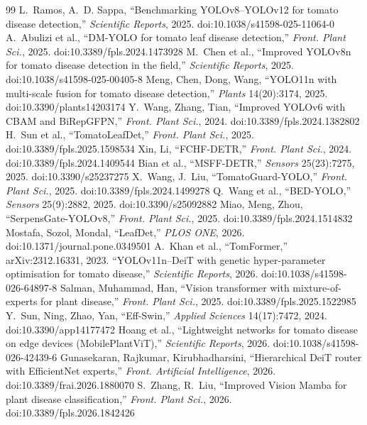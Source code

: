 \begin{thebibliography}{99}
 L.~Ramos, A.~D. Sappa, ``Benchmarking YOLOv8--YOLOv12 for tomato disease detection,'' \emph{Scientific Reports}, 2025. doi:10.1038/s41598-025-11064-0
 A.~Abulizi et al., ``DM-YOLO for tomato leaf disease detection,'' \emph{Front. Plant Sci.}, 2025. doi:10.3389/fpls.2024.1473928
 M.~Chen et al., ``Improved YOLOv8n for tomato disease detection in the field,'' \emph{Scientific Reports}, 2025. doi:10.1038/s41598-025-00405-8
 Meng, Chen, Dong, Wang, ``YOLO11n with multi-scale fusion for tomato disease detection,'' \emph{Plants} 14(20):3174, 2025. doi:10.3390/plants14203174
 Y.~Wang, Zhang, Tian, ``Improved YOLOv6 with CBAM and BiRepGFPN,'' \emph{Front. Plant Sci.}, 2024. doi:10.3389/fpls.2024.1382802
 H.~Sun et al., ``TomatoLeafDet,'' \emph{Front. Plant Sci.}, 2025. doi:10.3389/fpls.2025.1598534
 Xin, Li, ``FCHF-DETR,'' \emph{Front. Plant Sci.}, 2024. doi:10.3389/fpls.2024.1409544
 Bian et al., ``MSFF-DETR,'' \emph{Sensors} 25(23):7275, 2025. doi:10.3390/s25237275
 X.~Wang, J.~Liu, ``TomatoGuard-YOLO,'' \emph{Front. Plant Sci.}, 2025. doi:10.3389/fpls.2024.1499278
 Q.~Wang et al., ``BED-YOLO,'' \emph{Sensors} 25(9):2882, 2025. doi:10.3390/s25092882
 Miao, Meng, Zhou, ``SerpensGate-YOLOv8,'' \emph{Front. Plant Sci.}, 2025. doi:10.3389/fpls.2024.1514832
 Mostafa, Sozol, Mondal, ``LeafDet,'' \emph{PLOS ONE}, 2026. doi:10.1371/journal.pone.0349501
 A.~Khan et al., ``TomFormer,'' arXiv:2312.16331, 2023.
 ``YOLOv11n--DeiT with genetic hyper-parameter optimisation for tomato disease,'' \emph{Scientific Reports}, 2026. doi:10.1038/s41598-026-64897-8
 Salman, Muhammad, Han, ``Vision transformer with mixture-of-experts for plant disease,'' \emph{Front. Plant Sci.}, 2025. doi:10.3389/fpls.2025.1522985
 Y.~Sun, Ning, Zhao, Yan, ``Eff-Swin,'' \emph{Applied Sciences} 14(17):7472, 2024. doi:10.3390/app14177472
 Hoang et al., ``Lightweight networks for tomato disease on edge devices (MobilePlantViT),'' \emph{Scientific Reports}, 2026. doi:10.1038/s41598-026-42439-6
 Gunasekaran, Rajkumar, Kirubhadharsini, ``Hierarchical DeiT router with EfficientNet experts,'' \emph{Front. Artificial Intelligence}, 2026. doi:10.3389/frai.2026.1880070
 S.~Zhang, R.~Liu, ``Improved Vision Mamba for plant disease classification,'' \emph{Front. Plant Sci.}, 2026. doi:10.3389/fpls.2026.1842426

\end{thebibliography}
